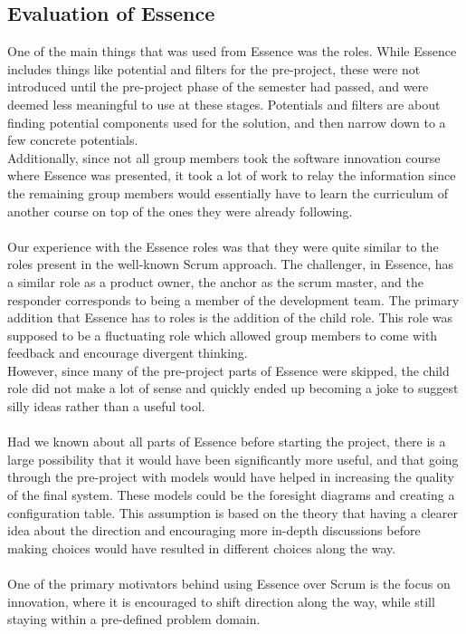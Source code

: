 \subsection{Evaluation of Essence}
One of the main things that was used from Essence was the roles.
While Essence includes things like potential and filters for the pre-project, these were not introduced until the pre-project phase of the semester had passed, and were deemed less meaningful to use at these stages.
Potentials and filters are about finding potential components used for the solution, and then narrow down to a few concrete potentials.\\
Additionally, since not all group members took the software innovation course where Essence was presented, it took a lot of work to relay the information since the remaining group members would essentially have to learn the curriculum of another course on top of the ones they were already following.
\\\\
Our experience with the Essence roles was that they were quite similar to the roles present in the well-known Scrum approach.
The challenger, in Essence, has a similar role as a product owner, the anchor as the scrum master, and the responder corresponds to being a member of the development team.
The primary addition that Essence has to roles is the addition of the child role.
This role was supposed to be a fluctuating role which allowed group members to come with feedback and encourage divergent thinking.\\
However, since many of the pre-project parts of Essence were skipped, the child role did not make a lot of sense and quickly ended up becoming a joke to suggest silly ideas rather than a useful tool.
\\\\
Had we known about all parts of Essence before starting the project, there is a large possibility that it would have been significantly more useful, and that going through the pre-project with models would have helped in increasing the quality of the final system.
These models could be the foresight diagrams and creating a configuration table.
This assumption is based on the theory that having a clearer idea about the direction and encouraging more in-depth discussions before making choices would have resulted in different choices along the way.
\\\\
One of the primary motivators behind using Essence over Scrum is the focus on innovation, where it is encouraged to shift direction along the way, while still staying within a pre-defined problem domain.
